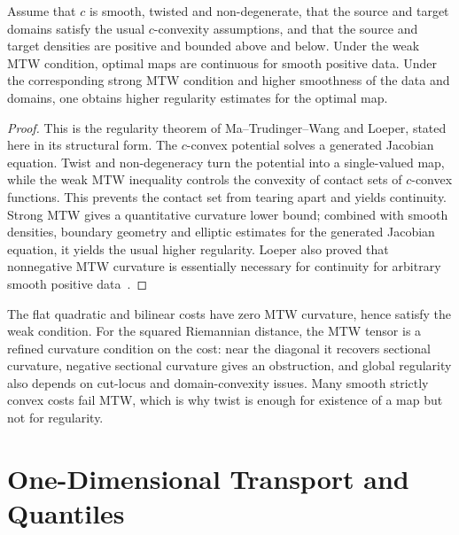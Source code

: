 \begin{prop}\label{prop-mtw-regularity-implication}
	Assume that $c$ is smooth, twisted and non-degenerate, that the source and target domains satisfy the usual $c$-convexity assumptions, and that the source and target densities are positive and bounded above and below. Under the weak MTW condition, optimal maps are continuous for smooth positive data. Under the corresponding strong MTW condition and higher smoothness of the data and domains, one obtains higher regularity estimates for the optimal map.
\end{prop}
\begin{proof}
	This is the regularity theorem of Ma--Trudinger--Wang and Loeper, stated here in its structural form. The $c$-convex potential solves a generated Jacobian equation. Twist and non-degeneracy turn the potential into a single-valued map, while the weak MTW inequality controls the convexity of contact sets of $c$-convex functions. This prevents the contact set from tearing apart and yields continuity. Strong MTW gives a quantitative curvature lower bound; combined with smooth densities, boundary geometry and elliptic estimates for the generated Jacobian equation, it yields the usual higher regularity. Loeper also proved that nonnegative MTW curvature is essentially necessary for continuity for arbitrary smooth positive data~\cite{loeper2009regularity,Villani09}.
\end{proof}

The flat quadratic and bilinear costs have zero MTW curvature, hence satisfy the weak condition. For the squared Riemannian distance, the MTW tensor is a refined curvature condition on the cost: near the diagonal it recovers sectional curvature, negative sectional curvature gives an obstruction, and global regularity also depends on cut-locus and domain-convexity issues. Many smooth strictly convex costs fail MTW, which is why twist is enough for existence of a map but not for regularity.

\section{One-Dimensional Transport and Quantiles}
\label{sec-1d-transport-quantiles}

